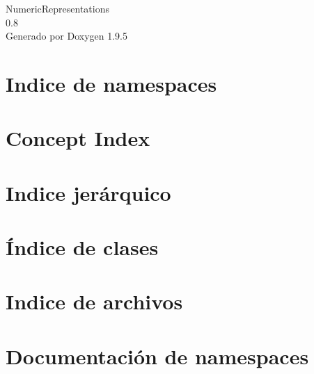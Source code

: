 \documentclass[twoside]{book}
\newcommand{\+}{\discretionary{\mbox{\scriptsize$\hookleftarrow$}}{}{}}
\newcommand{\clearemptydoublepage}{%
    \newpage{\pagestyle{empty}\cleardoublepage}%
  }
\begin{document}
  \raggedbottom
    \hypersetup{pageanchor=false,
                bookmarksnumbered=true,
                pdfencoding=unicode
               }
  \begin{titlepage}
  \vspace*{7cm}
  \begin{center}%
  {\Large Numeric\+Representations}\\
  [1ex]\large 0.\+8 \\
  \vspace*{1cm}
  {\large Generado por Doxygen 1.9.5}\\
  \end{center}
  \end{titlepage}
  \clearemptydoublepage
  \tableofcontents
  \clearemptydoublepage
  \hypersetup{pageanchor=true}
\chapter{Indice de namespaces}

\chapter{Concept Index}

\chapter{Indice jerárquico}

\chapter{Índice de clases}

\chapter{Indice de archivos}

\chapter{Documentación de namespaces}








\end{document}
